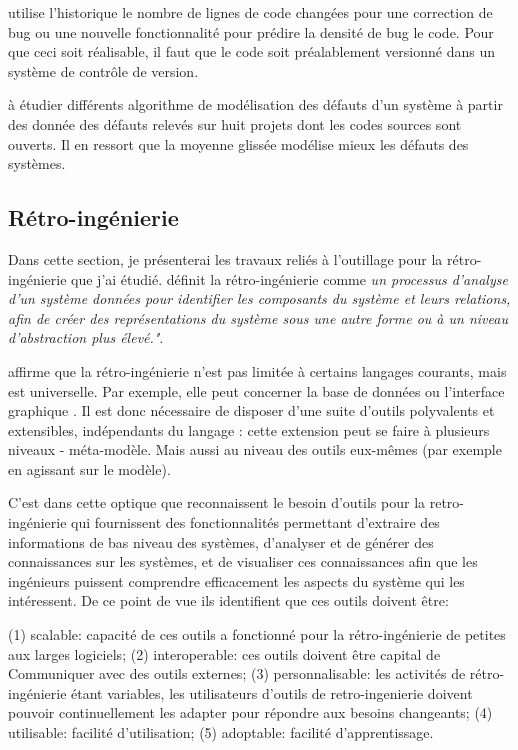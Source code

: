 \documentclass[a4paper]{article}
\begin{document}
\citet{naga05} utilise l'historique le nombre de lignes de code changées pour une correction de  bug  ou une nouvelle fonctionnalité pour prédire la densité de bug le code. Pour que ceci soit réalisable, il faut que le code soit préalablement versionné dans un système de contrôle de version.

\citet{Raja09} à étudier différents algorithme de modélisation des défauts d'un système à partir des donnée des défauts relevés sur huit projets dont les codes sources sont ouverts. Il en ressort que la moyenne glissée modélise mieux les défauts des systèmes.

\subsection{Rétro-ingénierie}
\label{sec:retroingenierie}
Dans cette section, je présenterai les travaux reliés à l'outillage pour la rétro-ingénierie que j'ai étudié.
\citet{Chik90a} définit la rétro-ingénierie comme \textit{un processus d'analyse d'un système données pour identifier les composants du système et leurs relations, afin de créer des représentations du système sous une autre forme ou à un niveau d'abstraction plus élevé."}.

\citet{Brun14c} affirme que la rétro-ingénierie n'est pas limitée à certains langages courants, mais est universelle. 
Par exemple, elle peut concerner la base de données \cite{Delp20a} ou l'interface graphique \cite{Verh19a}.
Il est donc nécessaire de disposer d'une suite d'outils polyvalents et extensibles, indépendants du langage : cette extension peut se faire à plusieurs niveaux - méta-modèle.
Mais aussi au niveau des outils eux-mêmes (par exemple en agissant sur le modèle).

C'est dans cette optique que \citet{Kien10a} reconnaissent  le besoin d'outils pour la retro-ingénierie qui fournissent des fonctionnalités permettant d'extraire des informations de bas niveau des systèmes, d'analyser et de générer des connaissances sur les systèmes, et de visualiser ces connaissances afin que les ingénieurs puissent comprendre efficacement les aspects du système qui les intéressent.
De ce point de vue ils identifient que ces outils doivent être:

  (1) scalable: capacité de ces outils a fonctionné pour la rétro-ingénierie de petites aux larges logiciels;
  (2) interoperable: ces outils doivent être capital de Communiquer avec des outils externes;
 (3) personnalisable: les activités de rétro-ingénierie étant variables, les utilisateurs d'outils de retro-ingenierie doivent pouvoir continuellement
 les  adapter pour répondre aux besoins changeants;
 (4) utilisable: facilité d'utilisation;
(5) adoptable: facilité d'apprentissage.
\end{document}
